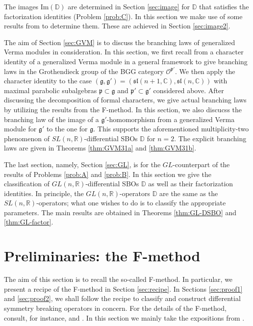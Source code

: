 \documentclass[reqno,11pt]{amsart}
\theoremstyle{remark}
\theoremstyle{definition}
\numberwithin{equation}{section}
\newcommand{\fg}{{\mathfrak g}}
\newcommand{\fp}{{\mathfrak p}}
\newcommand{\f}{\mathfrak}
\newcommand{\R}{\mathbb{R}}
\newcommand{\C}{\mathbb{C}}
\newcommand{\Cal}{\mathcal}
\renewcommand{\Im}{\mathrm{Im}}
\newcommand{\bD}{\mathbb{D}}
\begin{document}
The images $\Im(\bD)$ are determined in Section \ref{sec:image} 
for $\bD$ that satisfies the factorization identities (Problem \ref{prob:C}). 
In this section we make use of some results
from \cite{KuOr24} to determine them. 
These are achieved in Section \ref{sec:image2}.

The aim of Section \ref{sec:GVM} is to discuss
the branching laws of generalized Verma modules in consideration.
In this section, we first recall from \cite{Kobayashi12} a character identity
of a generalized Verma module in a general framework to give 
branching laws in the Grothendieck group %
of the BGG category $\Cal{O}^{\fp'}$.
We then apply 
the character identity to the case $(\fg,\fg') = (\f{sl}(n+1,\C), \f{sl}(n,\C))$
with maximal parabolic subalgebras $\fp \subset \fg$ and $\fp' \subset \fg'$
considered above.
After discussing the decomposition of formal characters,
we give actual branching laws by utilizing the results from the F-method.
In this section, we also discucss the branching 
law of the image of a $\fg'$-homomorphism 
from a generalized Verma module for $\fg'$ to the one for $\fg$.
This supports the aforementioned multiplicity-two phenomenon
of $SL(n,\R)$-differential SBOs $\bD$ for $n=2$.
The explicit branching laws are given in
Theorems \ref{thm:GVM31a} and \ref{thm:GVM31b}.

The last section, namely, Section \ref{sec:GL}, is for the $GL$-counterpart of the results
of Problems \ref{prob:A} and \ref{prob:B}. In this section we give the classification of 
$GL(n,\R)$-differential SBOs $\bD$ as well as their factorization identities. In principle,
the $GL(n,\R)$-operators $\bD$ are the same as 
the $SL(n,\R)$-operators;
what one wishes to do is to classify the appropriate parameters. The main results are obtained in Theorems \ref{thm:GL-DSBO} and \ref{thm:GL-factor}.


\section{Preliminaries: the F-method}
\label{sec:Fmethod}

The aim of this section is to recall the so-called F-method.
In particular, we present a recipe of the F-method in Section \ref{sec:recipe}.
In Sections \ref{sec:proof1} and \ref{sec:proof2}, we shall follow the recipe to 
classify and construct differential symmetry breaking operators in concern.
For the details of the F-method, 
consult, for instance, \cite{KP1} and \cite{KuOr24}.
In this section we mainly take the expositions from \cite{KuOr24}.
\end{document}
